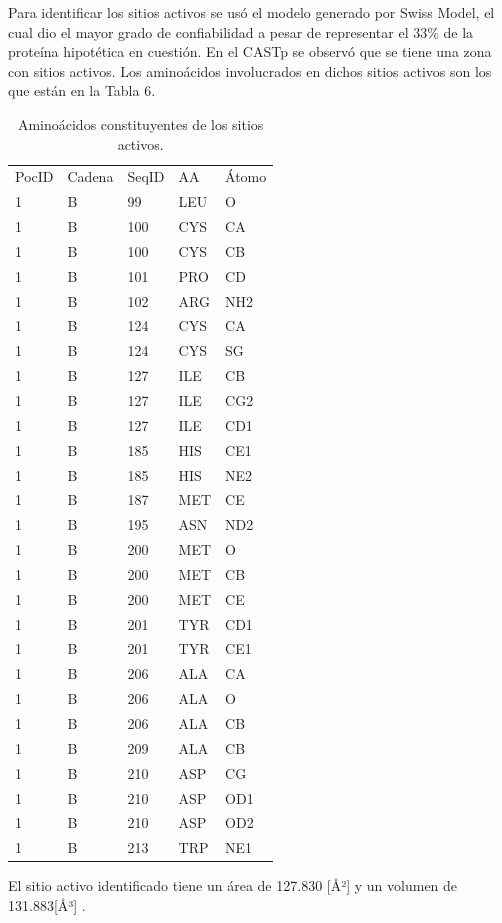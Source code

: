 \documentclass[journal,transmag]{IEEEtran}
\begin{document}
Para identificar los sitios activos se usó el modelo generado por Swiss Model, el cual dio el mayor grado de confiabilidad a pesar de representar el 33\% de la proteína hipotética en cuestión. 
En el CASTp se observó que se tiene una zona con sitios activos. Los aminoácidos involucrados en dichos sitios activos son los que están en la Tabla 6.  

\begin{table}[]
	\begin{tabular}{|lllll|}
		\hline
		PocID& Cadena & SeqID  & AA & Átomo \\
	 1&  B&99  & LEU & O \\
	 1&  B& 100 & CYS & CA \\
	 1&  B& 100 & CYS & CB \\
	 1&  B& 101 & PRO & CD \\
	 1&  B& 102 & ARG & NH2 \\
	 1&  B& 124 & CYS & CA \\
	 1&  B& 124 & CYS & SG \\
	 1&  B& 127 & ILE & CB \\
	 1&  B& 127 & ILE & CG2 \\
	 1&  B& 127 & ILE & CD1 \\
	 1&  B& 185 & HIS & CE1 \\
	 1&  B& 185 & HIS & NE2 \\
	 1&  B& 187 & MET & CE \\
	 1&  B& 195 & ASN & ND2 \\
	 1&  B& 200 & MET & O \\
	 1&  B& 200 & MET & CB \\
	 1&  B& 200 & MET & CE \\
	 1&  B& 201 & TYR & CD1 \\
	 1&  B& 201 & TYR & CE1 \\
	 1&  B& 206 & ALA & CA \\
	 1&  B& 206 & ALA & O \\
	 1&  B& 206 & ALA & CB \\
	 1&  B& 209 & ALA & CB \\
	 1&  B& 210 & ASP & CG \\
	 1&  B& 210 & ASP & OD1 \\
	 1&  B& 210 & ASP & OD2 \\
	 1&  B& 213 & TRP & NE1 \\ \hline
	 
	\end{tabular}
	\caption{Aminoácidos constituyentes de los sitios activos. }

	\end{table}
	El sitio activo identificado tiene un área de 127.830 [Å²]  y un volumen de 131.883[Å³] .
\end{document}

